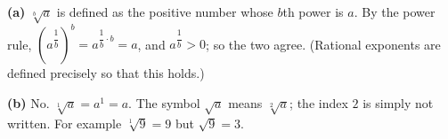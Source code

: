 \textbf{(a)} $\sqrt[b]a$ is defined as the positive number whose $b$th power is $a$. By the power rule, $\left(a^{\dfrac1b}\right)^b=a^{\dfrac1b\cdot b}=a$, and $a^{\dfrac1b}>0$; so the two agree. (Rational exponents are defined precisely so that this holds.)

\textbf{(b)} No. $\sqrt[1]a=a^1=a$. The symbol $\sqrt a$ means $\sqrt[2]a$; the index $2$ is simply not written. For example $\sqrt[1]9=9$ but $\sqrt9=3$.
